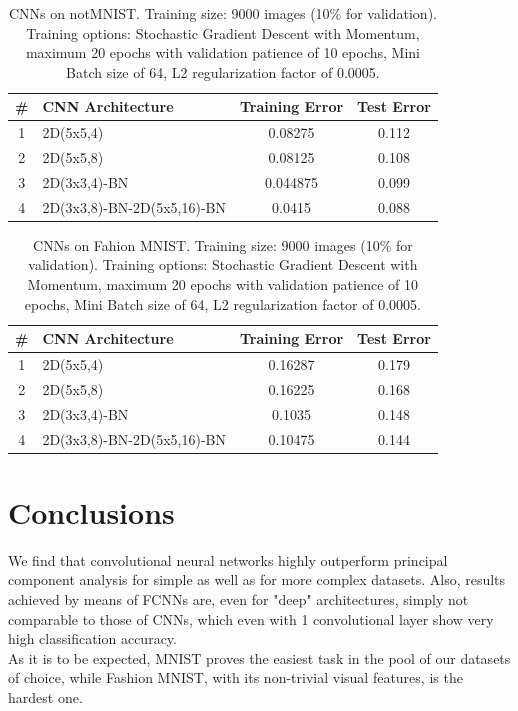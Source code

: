 \documentclass[letterpaper,12pt]{article}
\begin{document}
\begin{table}[p]
\centering
  \begin{tabular}{|c|l|c|c|}
  	\hline
    \# & CNN Architecture & Training Error & Test Error\\
    \hline
    \hline
       1 & 2D(5x5,4)     &              0.08275   &  0.112  \\   
   2 & 2D(5x5,8)   &         0.08125     &0.108  \\   
    3 & 2D(3x3,4)-BN     &       0.044875    & 0.099 \\    
    4 & 2D(3x3,8)-BN-2D(5x5,16)-BN     &        0.0415    & 0.088   \\
    \hline
  \end{tabular}
  \vspace{0.5em}
  \caption{CNNs on notMNIST. {Training size: 9000 images (10\% for validation). Training options: Stochastic Gradient Descent with Momentum, maximum 20 epochs with validation patience of 10 epochs, Mini Batch size of 64, L2 regularization factor of 0.0005.}}
\end{table}

\begin{table}[p]
\centering
  \begin{tabular}{|c|l|c|c|}
  	\hline
    \# & CNN Architecture & Training Error & Test Error\\
    \hline
    \hline
    1 & 2D(5x5,4)   &             0.16287    &  0.179     \\
    2 & 2D(5x5,8)   &            0.16225     & 0.168     \\
   3 & 2D(3x3,4)-BN   &           0.1035      &0.148   \\  
    4 & 2D(3x3,8)-BN-2D(5x5,16)-BN    &           0.10475      &0.144  \\
    \hline
  \end{tabular}
  \vspace{0.5em}
  \caption{CNNs on Fahion MNIST. {Training size: 9000 images (10\% for validation). Training options: Stochastic Gradient Descent with Momentum, maximum 20 epochs with validation patience of 10 epochs, Mini Batch size of 64, L2 regularization factor of 0.0005.}}
\end{table}

\section{Conclusions}
We find that convolutional neural networks highly outperform principal component analysis for simple as well as for more complex datasets. Also, results achieved by means of FCNNs are, even for "deep" architectures, simply not comparable to those of CNNs, which even with 1 convolutional layer show very high classification accuracy. \\
As it is to be expected, MNIST proves the easiest task in the pool of our datasets of choice, while Fashion MNIST, with its non-trivial visual features, is the hardest one.
\end{document}
